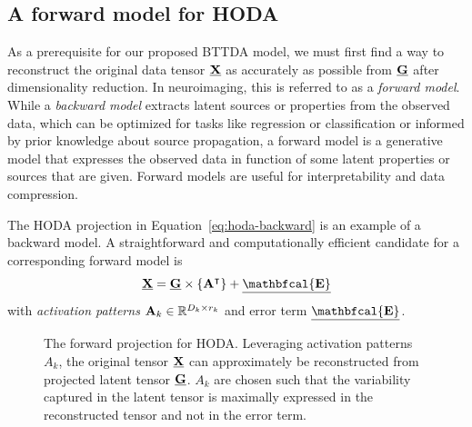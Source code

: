 \documentclass[twocolumn]{article}
\begin{document}
\subsection{A forward model for \textsc{HODA}}
As a prerequisite for our proposed \textsc{BTTDA} model, we must first find a
way to reconstruct the original data tensor $\underline{\mathbf{X}}$ as accurately as possible
from $\underline{\mathbf{G}}$ after dimensionality reduction.
In neuroimaging, this is referred to as a \emph{forward model}.
While a \emph{backward model} extracts latent sources or properties from the observed
data, which can be optimized for tasks like regression or classification or
informed by prior knowledge about source propagation, a forward model is a
generative model that expresses the observed data in function of some latent
properties or sources that are given. Forward models are useful for
interpretability and data compression.

The \textsc{HODA} projection in Equation~\ref{eq:hoda-backward} is an example
of a backward model.
A straightforward and computationally efficient candidate for a corresponding
forward model is
\begin{equation}
	\ten{X} = \ten{G}\mmpr{\mat{A}^\intercal} + \ten{\mathbfcal{E}}
	\label{eq:HODA-forward}
\end{equation}
with \emph{activation patterns} $\mathbf{A}_k \in \mathbb{R}^{D_k\times r_k}$
and error term $\ten{\mathbfcal{E}}$.
\begin{figure}[t]
	\centering
	
	\caption{The forward projection for \textsc{HODA}. Leveraging activation
		patterns $A_k$, the original tensor $\underline{\mathbf{X}}$ can approximately be
		reconstructed from projected latent tensor $\underline{\mathbf{G}}$. $A_k$ are chosen such
		that the variability captured in the latent tensor is maximally expressed in
		the reconstructed tensor and not in the error term.}
	\label{fig:HODA-forward}
\end{figure}
\end{document}
